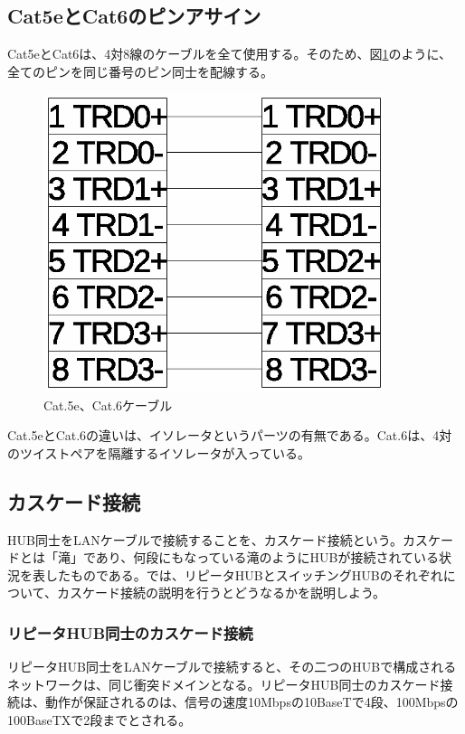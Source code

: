 \subsection{Cat5eとCat6のピンアサイン}
Cat5eとCat6は、4対8線のケーブルを全て使用する。そのため、図\ref{fig:cat5e}のように、全てのピンを同じ番号のピン同士を配線する。

\begin{figure}[htbp]
	\includegraphics[width=10cm,clip]{draw/cat5e.eps}
	\caption{Cat.5e、Cat.6ケーブル}
	\label{fig:cat5e}
\end{figure}

Cat.5eとCat.6の違いは、イソレータというパーツの有無である。Cat.6は、4対のツイストペアを隔離するイソレータが入っている。

\subsection{カスケード接続}

HUB同士をLANケーブルで接続することを、カスケード接続という。カスケードとは「滝」であり、何段にもなっている滝のようにHUBが接続されている状況を表したものである。では、リピータHUBとスイッチングHUBのそれぞれについて、カスケード接続の説明を行うとどうなるかを説明しよう。

\subsubsection{リピータHUB同士のカスケード接続}

リピータHUB同士をLANケーブルで接続すると、その二つのHUBで構成されるネットワークは、同じ衝突ドメインとなる。リピータHUB同士のカスケード接続は、動作が保証されるのは、信号の速度10Mbpsの10BaseTで4段、100Mbpsの100BaseTXで2段までとされる。

